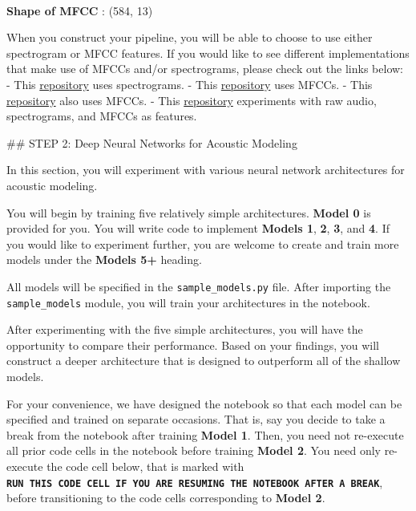 \documentclass[11pt]{article}
\begin{document}
    \begin{center}
    \end{center}
    { \hspace*{\fill} \\}
    
    \textbf{Shape of MFCC} : (584, 13)

    
    When you construct your pipeline, you will be able to choose to use
either spectrogram or MFCC features. If you would like to see different
implementations that make use of MFCCs and/or spectrograms, please check
out the links below: - This
\href{https://github.com/baidu-research/ba-dls-deepspeech}{repository}
uses spectrograms. - This
\href{https://github.com/mozilla/DeepSpeech}{repository} uses MFCCs. -
This
\href{https://github.com/buriburisuri/speech-to-text-wavenet}{repository}
also uses MFCCs. - This
\href{https://github.com/pannous/tensorflow-speech-recognition/blob/master/speech_data.py}{repository}
experiments with raw audio, spectrograms, and MFCCs as features.

     \#\# STEP 2: Deep Neural Networks for Acoustic Modeling

In this section, you will experiment with various neural network
architectures for acoustic modeling.

You will begin by training five relatively simple architectures.
\textbf{Model 0} is provided for you. You will write code to implement
\textbf{Models 1}, \textbf{2}, \textbf{3}, and \textbf{4}. If you would
like to experiment further, you are welcome to create and train more
models under the \textbf{Models 5+} heading.

All models will be specified in the \texttt{sample\_models.py} file.
After importing the \texttt{sample\_models} module, you will train your
architectures in the notebook.

After experimenting with the five simple architectures, you will have
the opportunity to compare their performance. Based on your findings,
you will construct a deeper architecture that is designed to outperform
all of the shallow models.

For your convenience, we have designed the notebook so that each model
can be specified and trained on separate occasions. That is, say you
decide to take a break from the notebook after training \textbf{Model
1}. Then, you need not re-execute all prior code cells in the notebook
before training \textbf{Model 2}. You need only re-execute the code cell
below, that is marked with
\textbf{\texttt{RUN\ THIS\ CODE\ CELL\ IF\ YOU\ ARE\ RESUMING\ THE\ NOTEBOOK\ AFTER\ A\ BREAK}},
before transitioning to the code cells corresponding to \textbf{Model
2}.
\end{document}

